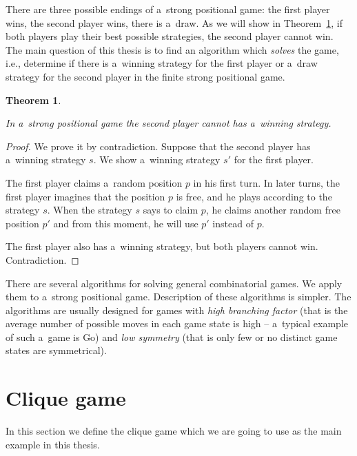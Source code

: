 There are three possible endings of a~strong positional game: the first player
wins, the second player wins, there is a~draw. As we will show in
Theorem~\ref{stealingStrategy}, if both players play their best possible
strategies, the second player cannot win. The main question of this thesis is
to find an algorithm which \emph{solves} the game, i.e., determine if there is
a~winning strategy for the first player or a~draw strategy for the second
player in the finite strong positional game.

\newtheorem{theorem}{Theorem} 
\begin{theorem} \label{stealingStrategy} 

In a~strong positional game the second player cannot has a~winning strategy.

\end{theorem}

\begin{proof}

We prove it by contradiction. Suppose that the second player has a~winning strategy
$s$. We show a~winning strategy $s'$ for the first player. 

The first player claims a~random position $p$ in his first turn. In later
turns, the first player imagines that the position $p$ is free, and he plays
according to the strategy $s$. When the strategy $s$ says to claim $p$, he claims
another random free position $p'$ and from this moment, he will use $p'$ instead
of $p$.

The first player also has a~winning strategy, but both players cannot win.
Contradiction. 

\end{proof}

There are several algorithms for solving general combinatorial games. We apply
them to a~strong positional game. Description of these algorithms is simpler.
The algorithms are usually designed for games with \emph{high branching factor}
(that is the average number of possible moves in each game state is high --
a~typical example of such a~game is Go) and \emph{low
symmetry} (that is only few or no distinct game states are symmetrical). 


\section{Clique game}

In this section we define the clique game which we are going to use as the
main example in this thesis.

